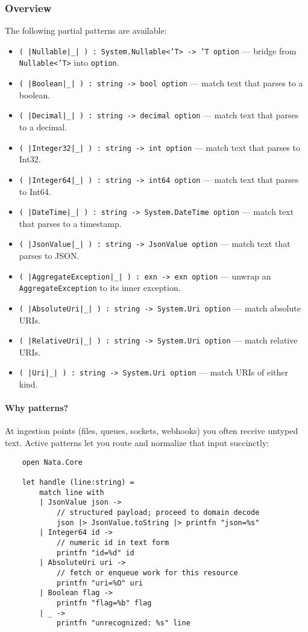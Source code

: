 \documentclass{article}
\begin{document}
\subsubsection{Overview}
The following partial patterns are available:
\begin{itemize}
  \item \texttt{( |Nullable|_| ) : System.Nullable<'T> -> 'T option} — bridge from \texttt{Nullable<'T>} into \texttt{option}.
  \item \texttt{( |Boolean|_| ) : string -> bool option} — match text that parses to a boolean.
  \item \texttt{( |Decimal|_| ) : string -> decimal option} — match text that parses to a decimal.
  \item \texttt{( |Integer32|_| ) : string -> int option} — match text that parses to Int32.
  \item \texttt{( |Integer64|_| ) : string -> int64 option} — match text that parses to Int64.
  \item \texttt{( |DateTime|_| ) : string -> System.DateTime option} — match text that parses to a timestamp.
  \item \texttt{( |JsonValue|_| ) : string -> JsonValue option} — match text that parses to JSON.
  \item \texttt{( |AggregateException|_| ) : exn -> exn option} — unwrap an \texttt{AggregateException} to its inner exception.
  \item \texttt{( |AbsoluteUri|_| ) : string -> System.Uri option} — match absolute URIs.
  \item \texttt{( |RelativeUri|_| ) : string -> System.Uri option} — match relative URIs.
  \item \texttt{( |Uri|_| ) : string -> System.Uri option} — match URIs of either kind.
\end{itemize}

\paragraph{Why patterns?}
At ingestion points (files, queues, sockets, webhooks) you often receive untyped text. Active patterns let you route and normalize that input succinctly:
\begin{verbatim}
    open Nata.Core

    let handle (line:string) =
        match line with
        | JsonValue json ->
            // structured payload; proceed to domain decode
            json |> JsonValue.toString |> printfn "json=%s"
        | Integer64 id ->
            // numeric id in text form
            printfn "id=%d" id
        | AbsoluteUri uri ->
            // fetch or enqueue work for this resource
            printfn "uri=%O" uri
        | Boolean flag ->
            printfn "flag=%b" flag
        | _ ->
            printfn "unrecognized: %s" line
\end{verbatim}
\end{document}
